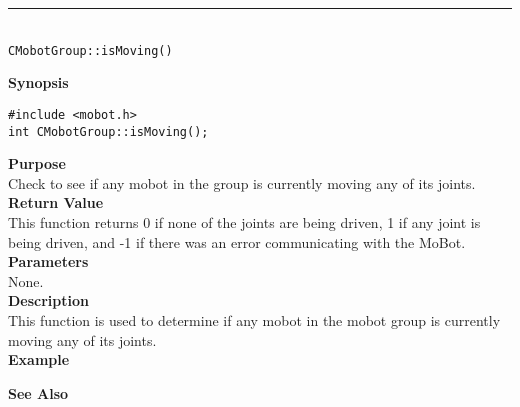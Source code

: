 \noindent
\vspace{5pt}
\rule{4.5in}{0.015in}\\
\noindent
{\LARGE \texttt{CMobotGroup::isMoving()}}\\
{}

\noindent
{\bf Synopsis}
\vspace{-8pt}
\begin{verbatim}
#include <mobot.h>
int CMobotGroup::isMoving();
\end{verbatim}

\noindent
{\bf Purpose}\\
Check to see if any mobot in the group is currently moving any of its joints.\\

\noindent
{\bf Return Value}\\
This function returns 0 if none of the joints are being driven, 1 if any joint
is being driven, and -1 if there was an error communicating with the MoBot.\\

\noindent
{\bf Parameters}\\
None.\\

\noindent
{\bf Description}\\
This function is used to determine if any mobot in the mobot group is currently moving any of
its joints. \\

\noindent
{\bf Example}\\
\noindent

\noindent
{\bf See Also}\\

